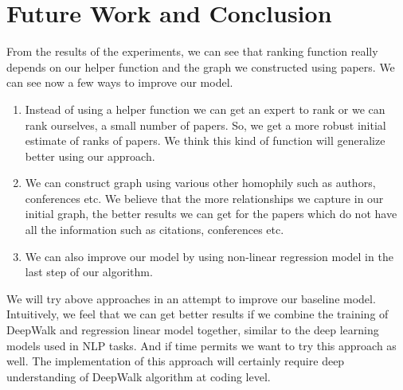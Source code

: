\documentclass[a4paper, 11pt]{article}
\begin{document}
\section{Future Work and Conclusion}
From the results of the experiments, we can see that ranking function really depends on our helper function and the graph we constructed using papers. We can see now a few ways to improve our model.
\begin{enumerate}
\item Instead of using a helper function we can get an expert to rank or we can rank ourselves, a small number of papers. So, we get a more robust initial estimate of ranks of papers. We think this kind of function will generalize better using our approach.
\item We can construct graph using various other homophily such as authors, conferences etc. We believe that the more relationships we capture in our initial graph, the better results we can get for the papers which do not have all the information such as citations, conferences etc.
\item We can also improve our model by using non-linear regression model in the last step of our algorithm.
\end{enumerate}
We will try above approaches in an attempt to improve our baseline model. Intuitively, we feel that we can get better results if we combine the training of DeepWalk and regression linear model together, similar to the deep learning models used in NLP tasks. And if time permits we want to try this approach as well. The implementation of this approach will certainly require deep understanding of DeepWalk algorithm at coding level.
\end{document}
